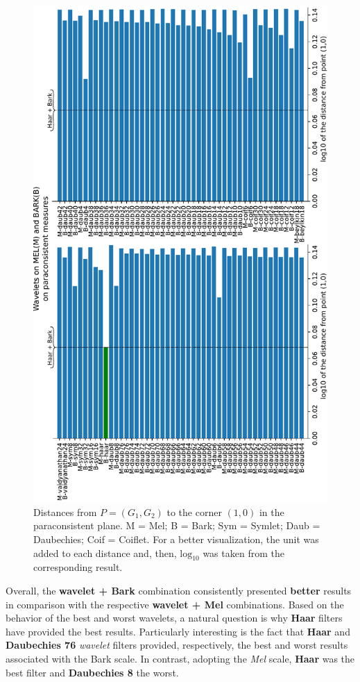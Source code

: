 		\begin{figure}[H]
			\centering
			\includegraphics[angle=-90,scale=.59]{images/results/paraconsistentPlane/ParaconsistentFull.pdf}
			\caption{Distances from $P=(G_1,G_2)$ to the corner $(1,0)$ in the paraconsistent plane. M = Mel; B = Bark; Sym = Symlet; Daub = Daubechies; Coif = Coiflet. For a better visualization, the unit was added to each distance and, then, $\text{log}_{10}$ was taken from the corresponding result.}
			\label{fig:paraconsistentfull}
		\end{figure}
		\par Overall, the \textbf{wavelet + Bark} combination consistently presented \textbf{better} results in comparison with the respective \textbf{wavelet + Mel} combinations. Based on the behavior of the best and worst wavelets, a natural question is why \textbf{Haar} filters have provided the best results. Particularly interesting is the fact that \textbf{Haar} and \textbf{Daubechies 76} \textit{wavelet} filters provided, respectively, the best and worst results associated with the Bark scale. In contrast, adopting the \textit{Mel} scale, \textbf{Haar} was the best filter and \textbf{Daubechies 8} the worst.
